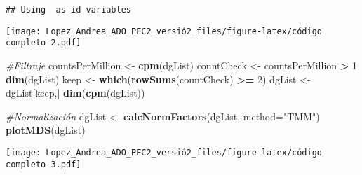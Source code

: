 \documentclass[
]{article}
\newenvironment{Shaded}{\begin{snugshade}}{\end{snugshade}}
\newcommand{\CommentTok}[1]{\textcolor[rgb]{0.56,0.35,0.01}{\textit{#1}}}
\newcommand{\DataTypeTok}[1]{\textcolor[rgb]{0.13,0.29,0.53}{#1}}
\newcommand{\DecValTok}[1]{\textcolor[rgb]{0.00,0.00,0.81}{#1}}
\newcommand{\KeywordTok}[1]{\textcolor[rgb]{0.13,0.29,0.53}{\textbf{#1}}}
\newcommand{\NormalTok}[1]{#1}
\newcommand{\OperatorTok}[1]{\textcolor[rgb]{0.81,0.36,0.00}{\textbf{#1}}}
\newcommand{\StringTok}[1]{\textcolor[rgb]{0.31,0.60,0.02}{#1}}
\begin{document}
\begin{verbatim}
## Using  as id variables
\end{verbatim}

\begin{Shaded}
\end{Shaded}

\texttt{[image: Lopez\_Andrea\_ADO\_PEC2\_versió2\_files/figure-latex/código completo-2.pdf]}

\begin{Shaded}
\begin{Highlighting}[]
\CommentTok{#Filtraje}
\NormalTok{countsPerMillion <-}\StringTok{ }\KeywordTok{cpm}\NormalTok{(dgList)}
\NormalTok{countCheck <-}\StringTok{ }\NormalTok{countsPerMillion }\OperatorTok{>}\StringTok{ }\DecValTok{1}
\KeywordTok{dim}\NormalTok{(dgList)}
\NormalTok{keep <-}\StringTok{ }\KeywordTok{which}\NormalTok{(}\KeywordTok{rowSums}\NormalTok{(countCheck) }\OperatorTok{>=}\StringTok{ }\DecValTok{2}\NormalTok{)}
\NormalTok{dgList <-}\StringTok{ }\NormalTok{dgList[keep,]}
\KeywordTok{dim}\NormalTok{(}\KeywordTok{cpm}\NormalTok{(dgList))}

\CommentTok{#Normalización}
\NormalTok{dgList <-}\StringTok{ }\KeywordTok{calcNormFactors}\NormalTok{(dgList, }\DataTypeTok{method=}\StringTok{"TMM"}\NormalTok{)}
\KeywordTok{plotMDS}\NormalTok{(dgList)}
\end{Highlighting}
\end{Shaded}

\texttt{[image: Lopez\_Andrea\_ADO\_PEC2\_versió2\_files/figure-latex/código completo-3.pdf]}
\end{document}

